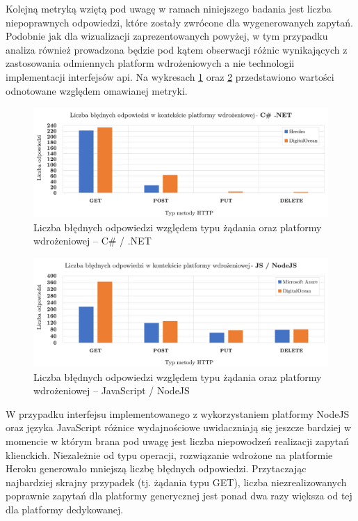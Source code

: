 Kolejną metryką wziętą pod uwagę w ramach niniejszego badania jest liczba niepoprawnych odpowiedzi, które zostały zwrócone dla wygenerowanych zapytań. Podobnie jak dla wizualizacji zaprezentowanych powyżej, w tym przypadku analiza również prowadzona będzie pod kątem obserwacji różnic wynikających z zastosowania odmiennych platform wdrożeniowych a nie technologii implementacji interfejsów api. Na wykresach \ref{fig:errors-for-plaforms-dotnet} oraz \ref{fig:errors-for-plaforms-nodejs} przedstawiono wartości odnotowane względem omawianej metryki.

\begin{figure}[htb]
  \centering
  \includegraphics[width=\textwidth]{rys05/dotnet-errors.pdf}
  \caption{Liczba błędnych odpowiedzi względem typu żądania oraz platformy wdrożeniowej -- C\# / .NET}
  \label{fig:errors-for-plaforms-dotnet}
\end{figure}

\begin{figure}[htb]
  \centering
	\includegraphics[width=\textwidth]{rys05/nodejs-errors.pdf}
  \caption{Liczba błędnych odpowiedzi względem typu żądania oraz platformy wdrożeniowej -- JavaScript / NodeJS}
  \label{fig:errors-for-plaforms-nodejs}
\end{figure}

W przypadku interfejsu implementowanego z wykorzystaniem platformy NodeJS oraz języka JavaScript różnice wydajnościowe uwidaczniają się jeszcze bardziej w momencie w którym brana pod uwagę jest liczba niepowodzeń realizacji zapytań klienckich. Niezależnie od typu operacji, rozwiązanie wdrożone na platformie Heroku generowało mniejszą liczbę błędnych odpowiedzi. Przytaczając najbardziej skrajny przypadek (tj. żądania typu GET), liczba niezrealizowanych poprawnie zapytań dla platformy generycznej jest ponad dwa razy większa od tej dla platformy dedykowanej.

